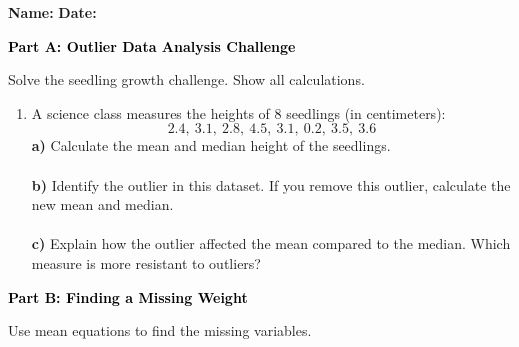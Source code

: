 \documentclass[12pt, letterpaper, fleqn]{article}
\newcommand{\blanklong}{\underline{\hspace{6.5cm}}}
\begin{document}
\textbf{Name:} \underline{\hspace{5cm}}
\hfill
\textbf{Date:} \underline{\hspace{3cm}}\\

\begin{tcolorbox}[colback=black!10]
    \large\textcolor{black}{\textbf{Part A: Outlier Data Analysis Challenge}}
\end{tcolorbox}

\vspace{3mm}

\noindent
Solve the seedling growth challenge. Show all calculations.

\vspace{5mm}

\begin{enumerate}[itemsep=2.2cm, leftmargin=0.6cm]
\item A science class measures the heights of 8 seedlings (in centimeters): \\
$$2.4, \ 3.1, \ 2.8, \ 4.5, \ 3.1, \ 0.2, \ 3.5, \ 3.6$$
\textbf{a)} Calculate the mean and median height of the seedlings. \\
\blanklong \\
\textbf{b)} Identify the outlier in this dataset. If you remove this outlier, calculate the new mean and median. \\
\blanklong \\
\textbf{c)} Explain how the outlier affected the mean compared to the median. Which measure is more resistant to outliers? \\
\blanklong
\end{enumerate}

\newpage

\begin{tcolorbox}[colback=black!10]
    \large\textcolor{black}{\textbf{Part B: Finding a Missing Weight}}
\end{tcolorbox}

\vspace{3mm}

\noindent
Use mean equations to find the missing variables.

\vspace{5mm}
\end{document}
